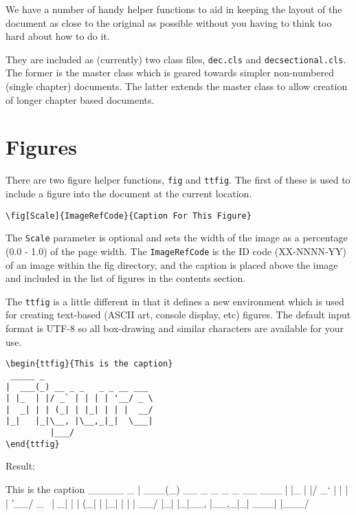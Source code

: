 \documentclass{decsectional}
\begin{document}
We have a number of handy helper functions to aid in keeping the layout of the document as close to the original
as possible without you having to think too hard about how to do it.

They are included as (currently) two class files, \texttt{dec.cls} and \texttt{decsectional.cls}. The former is the master class
which is geared towards simpler non-numbered (single chapter) documents. The latter extends the master class to allow
creation of longer chapter based documents.

\section{Figures}

There are two figure helper functions, \texttt{fig} and \texttt{ttfig}.  The first of these is used to include a figure
into the document at the current location.

\begin{verbatim}
\fig[Scale]{ImageRefCode}{Caption For This Figure}
\end{verbatim}

The \texttt{Scale} parameter is optional and sets the width of the image as a percentage (0.0 - 1.0) of the page width.
The \texttt{ImageRefCode} is the ID code (XX-NNNN-YY) of an image within the fig directory, and the caption is placed
above the image and included in the list of figures in the contents section.

The \texttt{ttfig} is a little different in that it defines a new environment which is used for creating
text-based (ASCII art, console display, etc) figures. The default input format is UTF-8 so all box-drawing and
similar characters are available for your use.


\begin{verbatim}
\begin{ttfig}{This is the caption}
 _____ _                      
|  ___(_) __ _ _   _ _ __ ___ 
| |_  | |/ _` | | | | '__/ _ \
|  _| | | (_| | |_| | | |  __/
|_|   |_|\__, |\__,_|_|  \___|
         |___/ 
\end{ttfig}
\end{verbatim}

Result:

\begin{ttfig}{This is the caption}
 _____ _
|  ___(_) __ _ _   _ _ __ ___
| |_  | |/ _` | | | | '__/ _ \
|  _| | | (_| | |_| | | |  __/
|_|   |_|\__, |\__,_|_|  \___|
         |___/
\end{ttfig}
\end{document}
